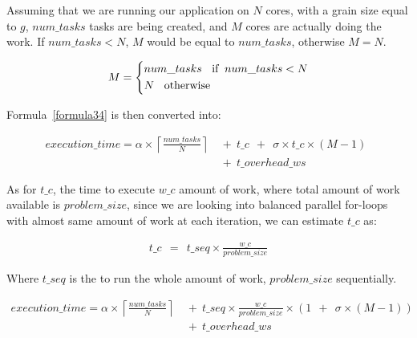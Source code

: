 Assuming that we are running our application on $N$ cores, with a grain size equal to $g$, $num\_{tasks}$ tasks are being created, and $M$ cores are actually doing the work. If $num\_{tasks}<N$, $M$ would be equal to $num\_{tasks}$, otherwise $M=N$.

\begin{equation}\label{formula19}
M=\left\{
\begin{aligned}
&num\_{tasks} \text{\:\:\:\:if \:} num\_{tasks}<N\\
&N \text{\:\:\:\:otherwise}
\end{aligned}
\right.
\end{equation}


Formula~\ref{formula34} is then converted into:

\begin{equation}\label{formula1}
\begin{aligned}
execution\_time = 
\alpha\times{\left\lceil{\frac{num\_{tasks}}{N}}\right\rceil}\:\:&+\:\:t\_c\:\:+\:\:\sigma\times{t\_c}\times{(M-1)}\:\:\\
&+\:\:t\_{overhead\_{ws}}
\end{aligned}
\end{equation}


As for $t\_{c}$, the time to execute $w\_{c}$ amount of work, where total amount of work available is $problem\_{size}$, since we are looking into balanced parallel for-loops with almost same amount of work at each iteration, we can estimate $t\_{c}$ as:

\begin{equation}\label{formula41}
\begin{aligned}
t\_{c}\:\:=\:\:t\_{seq}\times{\frac{w\_c}{problem\_{size}}}
\end{aligned}
\end{equation}

Where $t\_{seq}$ is the to run the whole amount of work, $problem\_{size}$ sequentially.

\begin{equation}\label{formula42}
\begin{aligned}
execution\_time = 
\alpha\times{\left\lceil{\frac{num\_{tasks}}{N}}\right\rceil}\:\:&+\:\:t\_{seq}\times{\frac{w\_c}{problem\_{size}}}\times{(1\:\:+\:\:\sigma\times{(M-1)})}\:\:\\
&+\:\:t\_{overhead\_{ws}}\\
\end{aligned}
\end{equation}


